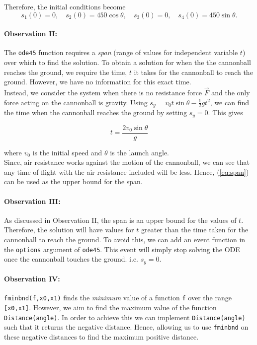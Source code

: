 \documentclass[11pt]{report}
\begin{document}
	Therefore, the initial conditions become 
	\begin{equation}
		s_1(0)=0, \quad s_2(0)=450\cos{\theta}, \quad s_3(0)=0, \quad s_4(0)=450\sin{\theta}.
	\end{equation}

\paragraph{Observation II:}
The \texttt{ode45} function requires a \emph{span} (range of values for independent variable $t$) over which to find the solution. To obtain a solution for when the the cannonball reaches the ground, we require the time, $t$ it takes for the cannonball to reach the ground. However, we have no information for this exact time. \\

Instead, we consider the system when there is no resistance force $\vec{F}$ and the only force acting on the cannonball is gravity. Using $s_y = v_0t\sin{\theta} - \frac{1}{2}gt^2$, we can find the time when the cannonball reaches the ground by setting $s_y=0$. This gives

\begin{equation}
	t=\frac{2v_0\sin{\theta}}{g}
	\label{eq:span}
\end{equation}

where $v_0$ is the initial speed and $\theta$ is the launch angle.\\

Since, air resistance works against the motion of the cannonball, we can see that any time of flight with the air resistance included will be less. Hence, (\ref{eq:span}) can be used as the upper bound for the span.

\paragraph{Observation III:}
As discussed in Observation II, the span is an upper bound for the values of $t$. Therefore, the solution will have values for $t$ greater than the time taken for the cannonball to reach the ground. To avoid this, we can add an event function in the \texttt{options} argument of \texttt{ode45}. This event will simply stop solving the ODE once the cannonball touches the ground. i.e. $s_y=0$.


\paragraph{Observation IV:}
\texttt{fminbnd(f,x0,x1)} finds the \emph{minimum} value of a function \texttt{f} over the range \texttt{[x0,x1]}. However, we aim to find the maximum value of the function \texttt{Distance(angle)}. In order to achieve this we can implement \texttt{Distance(angle)} such that it returns the negative distance. Hence, allowing us to use \texttt{fminbnd} on these negative distances to find the maximum positive distance.
\end{document}
